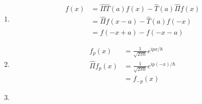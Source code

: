 \documentclass{article}
\begin{document}
\begin{enumerate}
  \item

        \begin{align*}
          [\hat{\Pi}, \hat{T}(a)] f(x) & = \hat{\Pi} \hat{T}(a) f(x) - \hat{T}(a) \hat{\Pi} f(x) \\
                                       & = \hat{\Pi} f(x - a) - \hat{T}(a) f(-x)                 \\
                                       & = f(-x + a) - f(-x - a)
        \end{align*}

  \item

        \begin{align*}
          f_p(x)           & = \frac{1}{\sqrt{2 \pi \hbar}} e^{i p x / \hbar}    \\
          \hat{\Pi} f_p(x) & = \frac{1}{\sqrt{2 \pi \hbar}} e^{i p (-x) / \hbar} \\
                           & = f_{-p}(x)
        \end{align*}

  \item


\end{enumerate}
\end{document}
